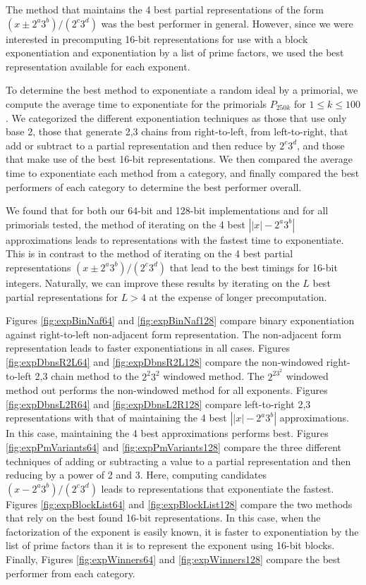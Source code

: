 \documentclass{ucalgthes1}
\theoremstyle{definition}
\begin{document}
The method that maintains the 4 best partial representations of the form $(x \pm 2^a3^b)/(2^c3^d)$ was the best performer in general.  However, since we were interested in precomputing 16-bit representations for use with a block exponentiation and exponentiation by a list of prime factors, we used the best representation available for each exponent.

To determine the best method to exponentiate a random ideal by a primorial, we compute the average time to exponentiate for the primorials $P_{250k}$ for $1 \le k \le 100$.  We categorized the different exponentiation techniques as those that use only base 2, those that generate 2,3 chains from right-to-left, from left-to-right, that add or subtract to a partial representation and then reduce by $2^c3^d$, and those that make use of the best 16-bit representations.  We then compared the average time to exponentiate each method from a category, and finally compared the best performers of each category to determine the best performer overall.

We found that for both our 64-bit and 128-bit implementations and for all primorials tested, the method of iterating on the 4 best $\left||x| - 2^a3^b\right|$ approximations leads to representations with the fastest time to exponentiate.  This is in contrast to the method of iterating on the 4 best partial representations $(x \pm 2^a3^b)/(2^c3^d)$ that lead to the best timings for 16-bit integers.  Naturally, we can improve these results by iterating on the $L$ best partial representations for $L > 4$ at the expense of longer precomputation.

Figures \ref{fig:expBinNaf64} and \ref{fig:expBinNaf128} compare binary exponentiation against right-to-left non-adjacent form representation.  The non-adjacent form representation leads to faster exponentiations in all cases.  Figures \ref{fig:expDbnsR2L64} and \ref{fig:expDbnsR2L128} compare the non-windowed right-to-left 2,3 chain method to the $2^2 3^2$ windowed method.  The $2^23^2$ windowed method out performs the non-windowed method for all exponents.  Figures \ref{fig:expDbnsL2R64} and \ref{fig:expDbnsL2R128} compare left-to-right 2,3 representations with that of maintaining the 4 best $\left||x|-2^a3^b\right|$ approximations.  In this case, maintaining the 4 best approximations performs best.  Figures \ref{fig:expPmVariants64} and \ref{fig:expPmVariants128} compare the three different techniques of adding or subtracting a value to a partial representation and then reducing by a power of 2 and 3.  Here, computing candidates $(x-2^a3^b)/(2^c3^d)$ leads to representations that exponentiate the fastest.  Figures \ref{fig:expBlockList64} and \ref{fig:expBlockList128} compare the two methods that rely on the best found 16-bit representations.  In this case, when the factorization of the exponent is easily known, it is faster to exponentiation by the list of prime factors than it is to represent the exponent using 16-bit blocks.  Finally, Figures \ref{fig:expWinners64} and \ref{fig:expWinners128} compare the best performer from each category.
\end{document}
